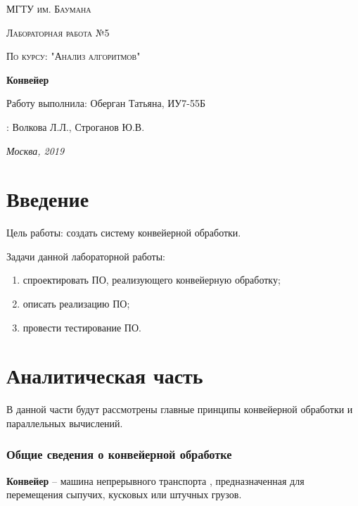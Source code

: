\documentclass[12pt]{report}
\begin{document}
\begin{titlepage}
	\centering
	{\scshape\LARGE МГТУ им. Баумана \par}
	\vspace{3cm}
	{\scshape\Large Лабораторная работа №5\par}
	\vspace{0.5cm}	
	{\scshape\Large По курсу: "Анализ алгоритмов"\par}
	\vspace{1.5cm}
	{\huge\bfseries Конвейер \par}
	\vspace{2cm}
	\Large Работу выполнила: Оберган Татьяна, ИУ7-55Б\par
	\vspace{0.5cm}
	:  Волкова Л.Л., Строганов Ю.В.\par

	\vfill
	\large \textit {Москва, 2019} \par
\end{titlepage}

\tableofcontents

\newpage
\chapter*{Введение}
Цель работы: создать систему конвейерной обработки.

Задачи данной лабораторной работы:
\begin{enumerate}
        \item спроектировать ПО, реализующего конвейерную обработку;
        \item описать реализацию ПО;
        \item провести тестирование ПО.
\end{enumerate}



\chapter{Аналитическая часть}
В данной части будут рассмотрены главные принципы конвейерной обработки и параллельных вычислений.

\subsection{Общие сведения о конвейерной обработке}
        
\textbf{Конвейер} – машина непрерывного транспорта \cite{mednov}, предназначенная для перемещения сыпучих, кусковых или штучных грузов.
		
\end{document}
